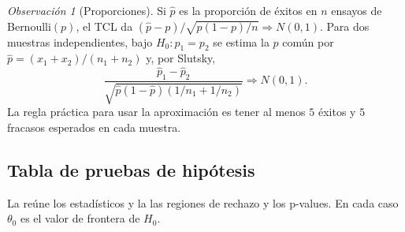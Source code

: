 \documentclass[11pt]{article}
\theoremstyle{plain}
\theoremstyle{definition}
\theoremstyle{remark}
\newtheorem{remark}[theorem]{Observación}
\theoremstyle{solstyle}
\newcommand{\1}{\mathbbm{1}}
\begin{document}
\begin{remark}[Proporciones]
Si $\widehat p$ es la proporción de éxitos en $n$ ensayos de Bernoulli$(p)$, el TCL da $(\widehat p-p)/\sqrt{p(1-p)/n}\Rightarrow N(0,1)$. Para dos muestras independientes, bajo $H_0:p_1=p_2$ se estima la $p$ común por $\widehat p=(x_1+x_2)/(n_1+n_2)$ y, por Slutsky,
\[
\frac{\widehat p_1-\widehat p_2}{\sqrt{\widehat p(1-\widehat p)(1/n_1+1/n_2)}}\Rightarrow N(0,1).
\]
 La regla práctica para usar la aproximación es tener al menos $5$ éxitos y $5$ fracasos esperados en cada muestra.
\end{remark}

\subsection{Tabla de pruebas de hipótesis}\label{subsec:tablapruebas}

La  reúne los estadísticos y la  las regiones de rechazo y los p-values. En cada caso $\theta_0$ es el valor de frontera de $H_0$.
\end{document}
